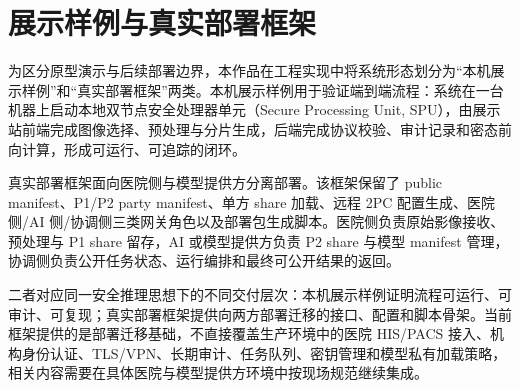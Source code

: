 \section{展示样例与真实部署框架}

为区分原型演示与后续部署边界，本作品在工程实现中将系统形态划分为“本机展示样例”和“真实部署框架”两类。本机展示样例用于验证端到端流程：系统在一台机器上启动本地双节点安全处理器单元（Secure Processing Unit, SPU），由展示站前端完成图像选择、预处理与分片生成，后端完成协议校验、审计记录和密态前向计算，形成可运行、可追踪的闭环。

真实部署框架面向医院侧与模型提供方分离部署。该框架保留了 public manifest、P1/P2 party manifest、单方 share 加载、远程 2PC 配置生成、医院侧/AI 侧/协调侧三类网关角色以及部署包生成脚本。医院侧负责原始影像接收、预处理与 P1 share 留存，AI 或模型提供方负责 P2 share 与模型 manifest 管理，协调侧负责公开任务状态、运行编排和最终可公开结果的返回。

二者对应同一安全推理思想下的不同交付层次：本机展示样例证明流程可运行、可审计、可复现；真实部署框架提供向两方部署迁移的接口、配置和脚本骨架。当前框架提供的是部署迁移基础，不直接覆盖生产环境中的医院 HIS/PACS 接入、机构身份认证、TLS/VPN、长期审计、任务队列、密钥管理和模型私有加载策略，相关内容需要在具体医院与模型提供方环境中按现场规范继续集成。
